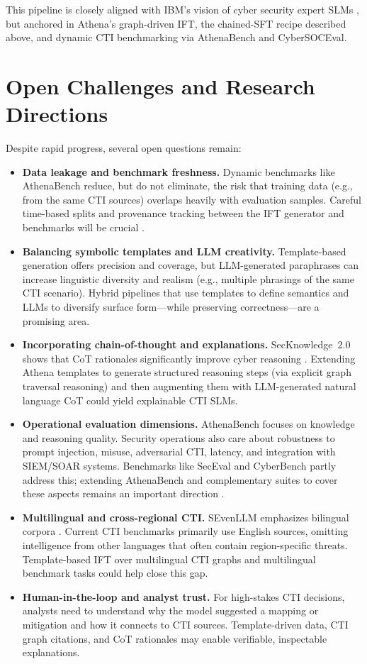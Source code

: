 \documentclass[unnumsec,webpdf,contemporary,large]{oup-authoring-template}
\theoremstyle{thmstyleone}
\theoremstyle{thmstyletwo}
\theoremstyle{thmstylethree}
\begin{document}
This pipeline is closely aligned with IBM's vision of cyber security expert SLMs \cite{levi2024cyberpal,levi2025toward}, but anchored in Athena's graph-driven IFT, the chained-SFT recipe described above, and dynamic CTI benchmarking via AthenaBench and CyberSOCEval.


\section{Open Challenges and Research Directions}

Despite rapid progress, several open questions remain:

\begin{itemize}
  \item \textbf{Data leakage and benchmark freshness.} Dynamic benchmarks like AthenaBench reduce, but do not eliminate, the risk that training data (e.g., from the same CTI sources) overlaps heavily with evaluation samples. Careful time-based splits and provenance tracking between the IFT generator and benchmarks will be crucial \cite{alam2025athenabench,cardei2025ift}.
  \item \textbf{Balancing symbolic templates and LLM creativity.} Template-based generation offers precision and coverage, but LLM-generated paraphrases can increase linguistic diversity and realism (e.g., multiple phrasings of the same CTI scenario). Hybrid pipelines that use templates to define semantics and LLMs to diversify surface form---while preserving correctness---are a promising area.
  \item \textbf{Incorporating chain-of-thought and explanations.} SecKnowledge~2.0 shows that CoT rationales significantly improve cyber reasoning \cite{levi2025toward}. Extending Athena templates to generate structured reasoning steps (via explicit graph traversal reasoning) and then augmenting them with LLM-generated natural language CoT could yield explainable CTI SLMs.
  \item \textbf{Operational evaluation dimensions.} AthenaBench focuses on knowledge and reasoning quality. Security operations also care about robustness to prompt injection, misuse, adversarial CTI, latency, and integration with SIEM/SOAR systems. Benchmarks like SecEval and CyberBench partly address this; extending AthenaBench and complementary suites to cover these aspects remains an important direction \cite{hu2024seceval,liu2024cyberbench,alam2025athenabench}.
  \item \textbf{Multilingual and cross-regional CTI.} SEvenLLM emphasizes bilingual corpora \cite{ji2024sevenllm}. Current CTI benchmarks primarily use English sources, omitting intelligence from other languages that often contain region-specific threats. Template-based IFT over multilingual CTI graphs and multilingual benchmark tasks could help close this gap.
  \item \textbf{Human-in-the-loop and analyst trust.} For high-stakes CTI decisions, analysts need to understand why the model suggested a mapping or mitigation and how it connects to CTI sources. Template-driven data, CTI graph citations, and CoT rationales may enable verifiable, inspectable explanations.
\end{itemize}
\end{document}
